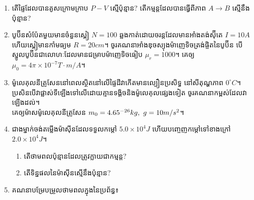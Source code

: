\documentclass{officialexam}
\begin{document}
\begin{enumerate}[I]
	\item តើផ្ទៃដែលបានគូសក្រោមក្រាប $P-V$ ស្មើប៉ុន្មាន? តើកម្មន្តដែលបានធ្វើពីភាព $A\rightarrow B$ ស្មើនឹងប៉ុន្មាន?
	\begin{center}
	\end{center}
	\item បូប៊ីនសំប៉ែតមួយមានចំនួនស្ពៀ $N=100$ ឆ្លងកាត់ដោយចរន្តដែលមានអាំងតង់ស៊ុីតេ $I=10A$ ហើយស្ពៀមានកាំមធ្យម $R=20cm$។ ចូរគណនាអាំងឌុចស្យុងម៉ាញេទិចត្រង់ផ្ចិតនៃបូប៊ីន បើស្នូលបូប៊ីនជាលោហៈដែលមានជម្រាបម៉ាញេទិចធៀប $\mu_r=1000$។ គេឲ្យ $\mu_0=4\pi \times10^{-7}T\cdot m/A$។
	\item ម៉ូលេគុលនីត្រូសែននៅពេលស្ថិតនៅលើផ្ទៃដីវាកើតមានល្បឿនប្រសិទ្ធ នៅសីតុណ្ហភាព $0^\circ C$។ ប្រសិនបើវាផ្លាស់ទីឡើងទៅលើដោយគ្មានទង្គិចនិងម៉ូលេគុលផ្សេងទៀត ចូរគណនាកម្ពស់ដែលវាឡើងដល់។\\ គេឲ្យម៉ាសម៉ូលេគុលនីត្រូសែន $m_0=4.65\time10^{-26}kg,~g=10m/s^2$។
	\item ជាងម្នាក់ចង់តម្លើងម៉ាសុីនដែលទទួលកម្តៅ $5.0\times10^{4}J$ ហើយបញ្ចេញកម្តៅទៅខាងក្រៅ $2.0\times10^{4}J$។
	\begin{enumerate}[k,2]
		\item តើថាមពលប៉ុន្មានដែលត្រូវក្លាយជាកម្មន្ត?
		\item តើទិន្នផលនៃម៉ាសុីនស្មើនឹងប៉ុន្មាន?
	\end{enumerate}
	\item គណនាបម្រែបម្រួលថាមពលក្នុងនៃប្រព័ន្ធ៖

\end{enumerate}
\end{document}

